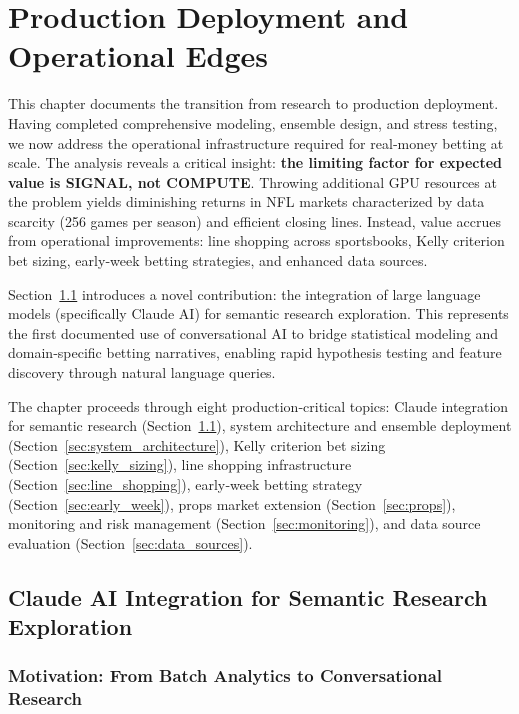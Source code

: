 
\chapter{Production Deployment and Operational Edges}
\label{chap:production}

This chapter documents the transition from research to production deployment. Having completed comprehensive modeling, ensemble design, and stress testing, we now address the operational infrastructure required for real‑money betting at scale. The analysis reveals a critical insight: \textbf{the limiting factor for expected value is SIGNAL, not COMPUTE}. Throwing additional GPU resources at the problem yields diminishing returns in NFL markets characterized by data scarcity (256 games per season) and efficient closing lines. Instead, value accrues from operational improvements: line shopping across sportsbooks, Kelly criterion bet sizing, early‑week betting strategies, and enhanced data sources.

Section~\ref{sec:claude_integration} introduces a novel contribution: the integration of large language models (specifically Claude AI) for semantic research exploration. This represents the first documented use of conversational AI to bridge statistical modeling and domain‑specific betting narratives, enabling rapid hypothesis testing and feature discovery through natural language queries.

The chapter proceeds through eight production‑critical topics: Claude integration for semantic research (Section~\ref{sec:claude_integration}), system architecture and ensemble deployment (Section~\ref{sec:system_architecture}), Kelly criterion bet sizing (Section~\ref{sec:kelly_sizing}), line shopping infrastructure (Section~\ref{sec:line_shopping}), early‑week betting strategy (Section~\ref{sec:early_week}), props market extension (Section~\ref{sec:props}), monitoring and risk management (Section~\ref{sec:monitoring}), and data source evaluation (Section~\ref{sec:data_sources}).

\section{Claude AI Integration for Semantic Research Exploration}
\label{sec:claude_integration}

\subsection{Motivation: From Batch Analytics to Conversational Research}
\label{subsec:motivation_conversational}

